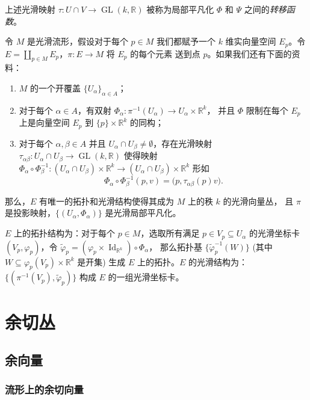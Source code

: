 \documentclass[fontset=none]{Notes}
\DeclareMathOperator\GL{GL}
\DeclareMathOperator\Id{Id}
\begin{document}
上述光滑映射 $\tau:U\cap V\to\GL(k,\mathbb{R})$ 被称为局部平凡化
$\varPhi$ 和 $\varPsi$ 之间的\emph{转移函数}。

\begin{lemma}[向量丛坐标卡引理]
  令 $M$ 是光滑流形，假设对于每个 $p\in M$ 我们都赋予一个 $k$ 维实向量空间
  $E_p$。令 $E=\coprod_{p\in M}E_p$，$\pi:E\to M$ 将 $E_p$ 的每个元素
  送到点 $p$。如果我们还有下面的资料：
  \begin{enumerate}
    \item $M$ 的一个开覆盖 $\{U_\alpha\}_{\alpha\in A}$；
    \item 对于每个 $\alpha\in A$，有双射 $\varPhi_\alpha:\pi^{-1}(U_\alpha)\to U_\alpha\times \mathbb{R}^k$，
    并且 $\varPhi$ 限制在每个 $E_p$ 上是向量空间 $E_p$ 到 $\{p\}\times \mathbb{R}^k$ 的同构；
    \item 对于每个 $\alpha,\beta\in A$ 并且 $U_\alpha\cap U_\beta\neq\emptyset$，存在光滑映射
    $\tau_{\alpha\beta}:U_\alpha\cap U_\beta\to \GL(k,\mathbb{R})$ 使得映射
    $\varPhi_\alpha\circ\varPhi_\beta^{-1}:(U_\alpha\cap U_\beta)\times \mathbb{R}^k\to (U_\alpha\cap U_\beta)\times \mathbb{R}^k$
    形如
    \[
      \varPhi_\alpha\circ\varPhi_\beta^{-1}(p,v)=\bigl(p,\tau_{\alpha\beta}(p)v\bigr).  
    \]
  \end{enumerate}
  那么，$E$ 有唯一的拓扑和光滑结构使得其成为 $M$ 上的秩 $k$ 的光滑向量丛，
  且 $\pi$ 是投影映射，$\{(U_\alpha,\varPhi_\alpha)\}$ 是光滑局部平凡化。
\end{lemma}

\begin{lemma}
  $E$ 上的拓扑结构为：对于每个 $p\in M$，选取所有满足 $p\in V_p\subseteq U_\alpha$
  的光滑坐标卡 $(V_p,\varphi_p)$，令 $\tilde\varphi_p=(\varphi_p\times \Id_{\mathbb{R}^k})\circ\varPhi_\alpha$，
  那么拓扑基 $\{\tilde\varphi_p^{-1}(W)\}$ (其中 $W\subseteq \varphi_p(V_p)\times \mathbb{R}^k$ 是开集)
  生成 $E$ 上的拓扑。$E$ 的光滑结构为：$\{(\pi^{-1}(V_p),\tilde\varphi_p)\}$
  构成 $E$ 的一组光滑坐标卡。
\end{lemma} 


\chapter{余切丛}

\section{余向量}

\subsection{流形上的余切向量}
\end{document}
